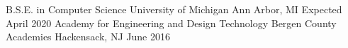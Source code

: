 \begin{cventries}
  \educationEntry
    {B.S.E. in Computer Science}
    {University of Michigan}
    {Ann Arbor, MI}
    {Expected April 2020}
    {}
  \educationEntry
    {Academy for Engineering and Design Technology}
    {Bergen County Academies}
    {Hackensack, NJ}
    {June 2016}
    {}
\end{cventries}